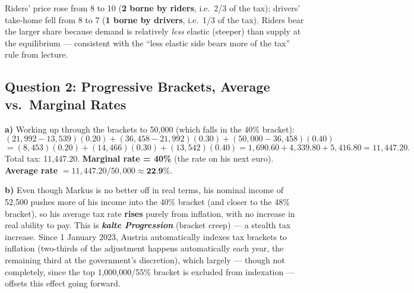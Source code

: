 \documentclass[11pt]{article}
\newcommand{\qpart}[1]{\par\vspace{0.3em}\noindent\textbf{#1}\quad}
\begin{document}
Riders' price rose from \texteuro{}8 to \texteuro{}10 (\textbf{\texteuro{}2 borne by riders}, i.e.\ 2/3 of the tax); drivers' take-home fell from \texteuro{}8 to \texteuro{}7 (\textbf{\texteuro{}1 borne by drivers}, i.e.\ 1/3 of the tax). Riders bear the larger share because demand is relatively \emph{less} elastic (steeper) than supply at the equilibrium --- consistent with the ``less elastic side bears more of the tax'' rule from lecture.

\subsection*{Question 2: Progressive Brackets, Average vs.\ Marginal Rates}

\qpart{a)} Working up through the brackets to \texteuro{}50{,}000 (which falls in the 40\% bracket):
\[
(21{,}992 - 13{,}539)(0.20) + (36{,}458 - 21{,}992)(0.30) + (50{,}000 - 36{,}458)(0.40)
\]
\[
= (8{,}453)(0.20) + (14{,}466)(0.30) + (13{,}542)(0.40) = 1{,}690.60 + 4{,}339.80 + 5{,}416.80 = 11{,}447.20.
\]
Total tax: \texteuro{}11{,}447.20.
\textbf{Marginal rate = 40\%} (the rate on his next euro). \textbf{Average rate} $= 11{,}447.20 / 50{,}000 \approx \textbf{22.9\%}$.

\qpart{b)} Even though Markus is no better off in real terms, his nominal income of \texteuro{}52{,}500 pushes more of his income into the 40\% bracket (and closer to the 48\% bracket), so his average tax rate \textbf{rises} purely from inflation, with no increase in real ability to pay. This is \textbf{\emph{kalte Progression}} (bracket creep) --- a stealth tax increase. Since 1 January 2023, Austria automatically indexes tax brackets to inflation (two-thirds of the adjustment happens automatically each year, the remaining third at the government's discretion), which largely --- though not completely, since the top \texteuro{}1{,}000{,}000/55\% bracket is excluded from indexation --- offsets this effect going forward.
\end{document}
